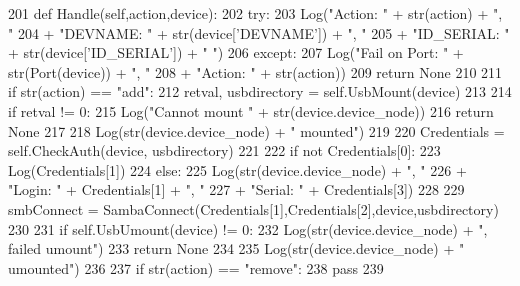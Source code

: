 \begin{DoxyCode}
201     \textcolor{keyword}{def }Handle(self,action,device):
202         \textcolor{keywordflow}{try}:
203             Log(\textcolor{stringliteral}{"Action: "} + str(action) + \textcolor{stringliteral}{", "}
204                 + \textcolor{stringliteral}{"DEVNAME: "} + str(device[\textcolor{stringliteral}{'DEVNAME'}]) + \textcolor{stringliteral}{", "}
205                 + \textcolor{stringliteral}{"ID\_SERIAL: "} + str(device[\textcolor{stringliteral}{'ID\_SERIAL'}]) + \textcolor{stringliteral}{" "})
206         \textcolor{keywordflow}{except}:
207             Log(\textcolor{stringliteral}{"Fail on Port: "} + str(Port(device)) + \textcolor{stringliteral}{", "}
208                 + \textcolor{stringliteral}{"Action: "} + str(action))
209             \textcolor{keywordflow}{return} \textcolor{keywordtype}{None}
210 
211         \textcolor{keywordflow}{if} str(action) == \textcolor{stringliteral}{"add"}:
212             retval, usbdirectory = self.UsbMount(device)
213 
214             \textcolor{keywordflow}{if} retval != 0:
215                 Log(\textcolor{stringliteral}{"Cannot mount "} + str(device.device\_node))
216                 \textcolor{keywordflow}{return} \textcolor{keywordtype}{None}
217 
218             Log(str(device.device\_node) + \textcolor{stringliteral}{" mounted"})
219 
220             Credentials = self.CheckAuth(device, usbdirectory)
221 
222             \textcolor{keywordflow}{if} \textcolor{keywordflow}{not} Credentials[0]:
223                 Log(Credentials[1])
224             \textcolor{keywordflow}{else}:
225                 Log(str(device.device\_node) + \textcolor{stringliteral}{", "}
226                     + \textcolor{stringliteral}{"Login: "} + Credentials[1] + \textcolor{stringliteral}{", "}
227                     + \textcolor{stringliteral}{"Serial: "} + Credentials[3])
228 
229                 smbConnect = SambaConnect(Credentials[1],Credentials[2],device,usbdirectory)
230 
231             \textcolor{keywordflow}{if} self.UsbUmount(device) != 0:
232                 Log(str(device.device\_node) + \textcolor{stringliteral}{", failed umount"})
233                 \textcolor{keywordflow}{return} \textcolor{keywordtype}{None}
234 
235             Log(str(device.device\_node) + \textcolor{stringliteral}{" umounted"})
236 
237         \textcolor{keywordflow}{if} str(action) == \textcolor{stringliteral}{"remove"}:
238             \textcolor{keywordflow}{pass}
239 
\end{DoxyCode}
\mbox{\label{classisofc-service-2_1_1DeviceHandler_a54a0e6f35c2bf9619c532a5940706655}} 
